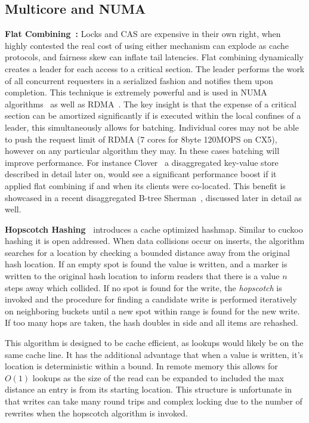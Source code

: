 \subsection{Multicore and NUMA}

\textbf{Flat Combining~\cite{flat-combine}:} Locks and CAS are expensive in their
own right, when highly contested the real cost of using either mechanism can
explode as cache protocols, and fairness skew can inflate tail latencies. Flat
combining dynamically creates a leader for each access to a critical section.
The leader performs the work of all concurrent requesters in a serialized
fashion and notifies them upon completion. This technique is extremely powerful
and is used in NUMA algorithms~\cite{black-box-numa} as well as
RDMA~\cite{flock}. The key insight is that the expense of a critical
section can be amortized significantly if is executed within the local confines
of a leader, this simultaneously allows for batching. Individual cores may not
be able to push the request limit of RDMA (7 cores for 8byte 120MOPS on CX5),
however on any particular algorithm they may. In these cases batching will
improve performance. For instance Clover~\cite{clover} a disaggregated key-value
store described in detail later on, would see a significant performance boost if
it applied flat combining if and when its clients were co-located. This benefit
is showcased in a recent disaggregated B-tree Sherman~\cite{sherman}, discussed
later in detail as well.

\textbf{Hopscotch Hashing~\cite{hopscotch}} introduces a cache optimized
hashmap. Similar to cuckoo hashing it is open addressed. When data collisions
occur on inserts, the algorithm searches for a location by checking a
bounded distance away from the original hash location. If an empty spot is found the
value is written, and a marker is written to the original hash location to
inform readers that there is a value $n$ steps away which collided. If no spot
is found for the write, the \textit{hopscotch} is invoked and the procedure for
finding a candidate write is performed iteratively on neighboring buckets until
a new spot within range is found for the new write. If too many hops are taken,
the hash doubles in side and all items are rehashed.

This algorithm is designed to be cache efficient, as lookups would likely be on
the same cache line. It has the additional advantage that when a value is
written, it's location is deterministic within a bound. In remote memory this
allows for $O(1)$ lookups as the size of the read can be expanded to included
the max distance an entry is from its starting location. This structure is
unfortunate in that writes can take many round trips and complex locking due to
the number of rewrites when the hopscotch algorithm is invoked.



